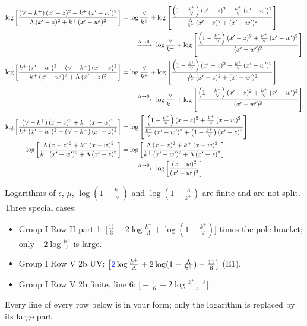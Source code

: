 \documentclass[10pt]{article}
\numberwithin{equation}{section}
\newcommand{\new}[1]{{\color{blue}#1}}
\begin{document}
\begin{align}
\log{\left[\frac{(\vee-k^{+})\,(x'-z)^{2}+k^{+}\,(x'-w')^{2}}{\Lambda\,(x'-z)^{2}+k^{+}\,(x'-w')^{2}}\right]} &= \log\frac{\vee}{k^+} + \log{\left[\frac{\left(1-\frac{k^{+}}{\vee}\right)(x'-z)^{2}+\frac{k^{+}}{\vee}\,(x'-w')^{2}}{\frac{\Lambda}{k^{+}}\,(x'-z)^{2}+(x'-w')^{2}}\right]}\notag\\&\qquad\xrightarrow{\Lambda\to0}\ \log\frac{\vee}{k^+} + \log{\left[\frac{\left(1-\frac{k^{+}}{\vee}\right)(x'-z)^{2}+\frac{k^{+}}{\vee}\,(x'-w')^{2}}{(x'-w')^{2}}\right]} \notag\\
\log{\left[\frac{k^{+}\, (x'-w')^{2} + (\vee - k^{+})\, (x'-z)^{2}}{k^{+}\, (x'-w')^{2} + \Lambda\, (x'-z)^{2}}\right]} &= \log\frac{\vee}{k^+} + \log{\left[\frac{\left(1-\frac{k^{+}}{\vee}\right)(x'-z)^{2}+\frac{k^{+}}{\vee}\,(x'-w')^{2}}{\frac{\Lambda}{k^{+}}\,(x'-z)^{2}+(x'-w')^{2}}\right]}\notag\\&\qquad\xrightarrow{\Lambda\to0}\ \log\frac{\vee}{k^+} + \log{\left[\frac{\left(1-\frac{k^{+}}{\vee}\right)(x'-z)^{2}+\frac{k^{+}}{\vee}\,(x'-w')^{2}}{(x'-w')^{2}}\right]} \notag\\
\log{\left[\frac{(\vee-k^{+})\,(x-z)^{2}+k^{+}\,(x-w)^{2}}{k^{+}\, (x'-w')^{2} + (\vee-k^{+})\, (x'-z)^{2}}\right]} &= \log{\left[\frac{\left(1-\frac{k^{+}}{\vee}\right)(x-z)^{2}+\frac{k^{+}}{\vee}\,(x-w)^{2}}{\frac{k^{+}}{\vee}\, (x'-w')^{2} + \left(1-\frac{k^{+}}{\vee}\right) (x'-z)^{2}}\right]} \notag\\
\log{\left[\frac{\Lambda\,(x-z)^{2}+k^{+}\,(x-w)^{2}}{k^{+}\, (x'-w')^{2} + \Lambda\, (x'-z)^{2}}\right]} &= \log{\left[\frac{\Lambda\,(x-z)^{2}+k^{+}\,(x-w)^{2}}{k^{+}\, (x'-w')^{2} + \Lambda\, (x'-z)^{2}}\right]}\notag\\&\qquad\xrightarrow{\Lambda\to0}\ \log{\left[\frac{(x-w)^{2}}{(x'-w')^{2}}\right]}
\end{align}

Logarithms of $\epsilon$, $\mu$, $\log(1-\frac{k^+}{\vee})$ and $\log(1-\frac{\Lambda}{k^+})$ are finite and are not split. Three special cases:
\begin{itemize}
\item Group I Row II part 1: $\big[\frac{11}{3}-2\log\frac{k^+}{\Lambda}+\log(1-\frac{k^+}{\vee})\big]$ times the pole bracket; only $-2\log\frac{k^+}{\Lambda}$ is large.
\item Group I Row V 2b UV: $\big[\new{2}\log\frac{k^+}{\Lambda}+2\log(1-\frac{\Lambda}{k^+})-\frac{11}{6}\big]$ (E1).
\item Group I Row V 2b finite, line 6: $\big[-\frac{11}{6}+2\log\frac{k^+-\Lambda}{\Lambda}\big]$.
\end{itemize}
Every line of every row below is in your form; only the logarithm is replaced by its large part.
\end{document}
